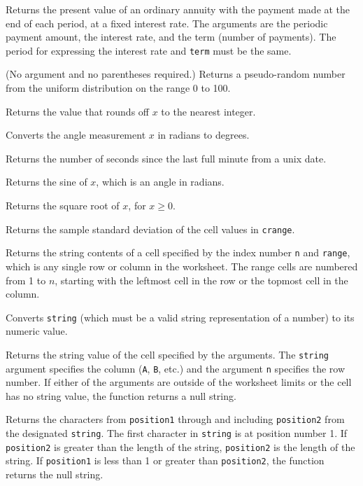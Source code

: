 \documentclass[titlepage]{article}
\begin{document}
 Returns the present value of
an ordinary annuity with the payment made at the end of each period, at
a fixed interest rate.  The arguments are the periodic payment amount,
the interest rate, and the term (number of payments).  The period for
expressing the interest rate and \texttt{term} must be the same.

 (No argument and no parentheses required.)  Returns a
pseudo-random number from the uniform distribution on the range 0 to
100.

 Returns the value that rounds off $x$ to the nearest
integer.

 Converts the angle measurement $x$ in radians to
degrees.

 Returns the number of seconds since the last
full minute from a unix date.

 Returns the sine of $x$, which is an angle in
radians.

 Returns the square root of $x$, for $x \ge 0$.

 Returns the sample standard deviation of the
cell values in \texttt{crange}.

 Returns the string contents of a cell
specified by the index number \texttt{n} and \texttt{range}, which is
any single row or column in the worksheet.  The range cells are
numbered from 1 to $n$, starting with the leftmost cell in the row or
the topmost cell in the column.

 Converts \texttt{string} (which must be a
valid string representation of a number) to its numeric
value. 

 Returns the string value of the cell
specified by the arguments.  The \texttt{string} argument specifies
the column (\texttt{A}, \texttt{B}, etc.) and the argument \texttt{n}
specifies the row number.  If either of the arguments are outside of
the worksheet limits or the cell has no string value, the function
returns a null string.

 Returns the characters
from \texttt{position1} through and including \texttt{position2} from
the designated \texttt{string}.  The first character in
\texttt{string} is at position number 1.  If \texttt{position2} is
greater than the length of the string, \texttt{position2} is the
length of the string.  If \texttt{position1} is less than 1 or greater
than \texttt{position2}, the function returns the null string.
\end{document}
